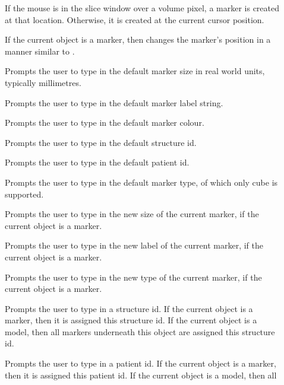 \begin{description}
\item[]  If the mouse is in the slice window
        over a volume pixel, a marker is created at that location.  Otherwise,
        it is created at the current cursor position.
\item[]  If the current object is a marker,
        then changes the marker's position in a manner similar to
        .
\item[]  Prompts the user to type in the default
        marker size in real world units, typically millimetres.
\item[]  Prompts the user to type in the default
        marker label string.
\item[]  Prompts the user to type in the
        default marker colour.
\item[]  Prompts the user to type in the
        default structure id.
\item[]  Prompts the user to type in the
        default patient id.
\item[]  Prompts the user to type in the
        default marker type, of which only cube is supported.
\item[]  Prompts the user to type in the
        new size of the current marker, if the current object is a marker.
\item[]  Prompts the user to type in the
        new label of the current marker, if the current object is a marker.
\item[]  Prompts the user to type in the
        new type of the current marker, if the current object is a marker.
\item[]  Prompts the user to type in a
        structure id.  If the current object is a marker, then it is assigned
        this structure id.  If the current object is a model, then all
        markers underneath this object are assigned this structure id.
\item[]  Prompts the user to type in a
        patient id.  If the current object is a marker, then it is assigned
        this patient id.  If the current object is a model, then all

\end{description}
